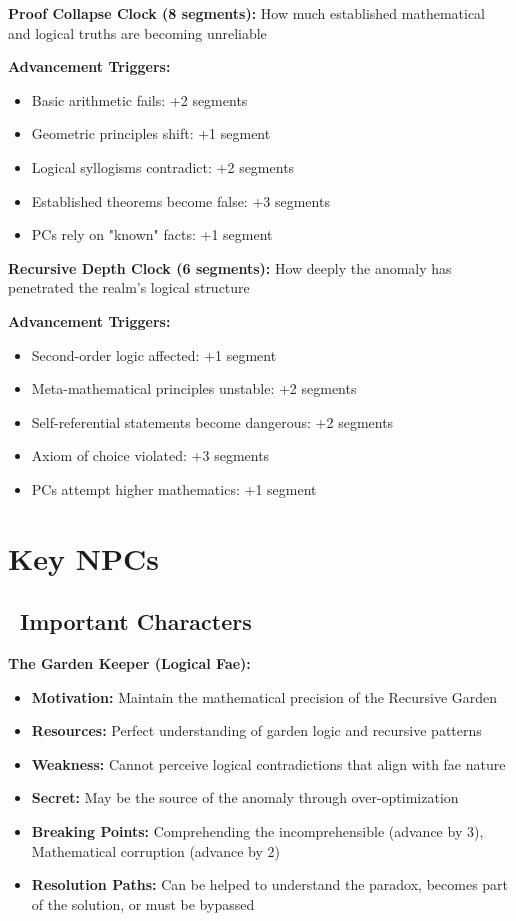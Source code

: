 \documentclass[11pt]{article}
\begin{document}
\textbf{Proof Collapse Clock (8 segments):}
How much established mathematical and logical truths are becoming unreliable

\textbf{Advancement Triggers:}
\begin{itemize}
    \item Basic arithmetic fails: +2 segments
    \item Geometric principles shift: +1 segment
    \item Logical syllogisms contradict: +2 segments
    \item Established theorems become false: +3 segments
    \item PCs rely on "known" facts: +1 segment
\end{itemize}

\textbf{Recursive Depth Clock (6 segments):}
How deeply the anomaly has penetrated the realm's logical structure

\textbf{Advancement Triggers:}
\begin{itemize}
    \item Second-order logic affected: +1 segment
    \item Meta-mathematical principles unstable: +2 segments
    \item Self-referential statements become dangerous: +2 segments
    \item Axiom of choice violated: +3 segments
    \item PCs attempt higher mathematics: +1 segment
\end{itemize}

\section{Key NPCs}

\subsection*{\faUsers\ Important Characters}

\textbf{The Garden Keeper (Logical Fae):}
\begin{itemize}
    \item \textbf{Motivation:} Maintain the mathematical precision of the Recursive Garden
    \item \textbf{Resources:} Perfect understanding of garden logic and recursive patterns
    \item \textbf{Weakness:} Cannot perceive logical contradictions that align with fae nature
    \item \textbf{Secret:} May be the source of the anomaly through over-optimization
    \item \textbf{Breaking Points:} Comprehending the incomprehensible (advance by 3), Mathematical corruption (advance by 2)
    \item \textbf{Resolution Paths:} Can be helped to understand the paradox, becomes part of the solution, or must be bypassed
\end{itemize}
\end{document}
